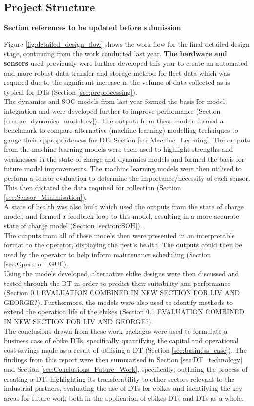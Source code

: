 \documentclass[a4paper, 10pt]{article}
\numberwithin{equation}{section}
\begin{document}
\subsection{Project Structure}

\textbf{Section references to be updated before submission}

Figure \ref{fig:detailed_design_flow} shows the work flow for the final detailed design stage, continuing from the work conducted last year. {\color{red} \textbf{The hardware and sensors}} used previously were further developed this year to create an automated and more robust data transfer and storage method for fleet data which was required due to the significant increase in the volume of data collected as is typical for DTs (Section \ref{sec:preprocessing}). 
\\
The dynamics and SOC models from last year formed the basis for model integration and were developed further to improve performance (Section \ref{sec:soc_dynamics_modeldev}). The outputs from these models formed a benchmark to compare alternative (machine learning) modelling techniques to gauge their appropriateness for DTs Section \ref{sec:Machine_Learning}. The outputs from the machine learning models were then used to highlight strengths and weaknesses in the state of charge and dynamics models and formed the basis for future model improvements. The machine learning models were then utilised to perform a sensor evaluation to determine the importance/necessity of each sensor. This then dictated the data required for collection (Section \ref{sec:Sensor_Minimisation}).
\\
A state of health was also built which used the outputs from the state of charge model, and formed a feedback loop to this model, resulting in a more accurate state of charge model (Section \ref{section:SOH}).
\\
The outputs from all of these models then were presented in an interpretable format to the operator, displaying the fleet's health. The outputs could then be used by the operator to help inform maintenance scheduling (Section \ref{sec:Operator_GUI}). 
\\
Using the models developed, alternative ebike designs were then discussed and tested through the DT in order to predict their suitability and performance (Section \ref{} EVALUATION COMBINED IN NEW SECTION FOR LIV AND GEORGE?). Furthermore, the models were also used to identify methods to extend the operation life of the 
ebikes (Section \ref{} EVALUATION COMBINED IN NEW SECTION FOR LIV AND GEORGE?). 
\\
The conclusions drawn from these work packages were used to formulate a business case of ebike DTs, specifically quantifying the capital and operational cost savings made as a result of utilising a DT (Section \ref{sec:business_case}). The findings from this report were then summarised in Section \ref{sec:DT_technology} and Section \ref{sec:Conclusions_Future_Work}, specifically, outlining the process of creating a DT, highlighting its transferability to other sectors relevant to the industrial partners, evaluating the use of DTs for ebikes and identifying the key areas for future work both in the application of ebikes DTs and DTs as a whole.
\end{document}
